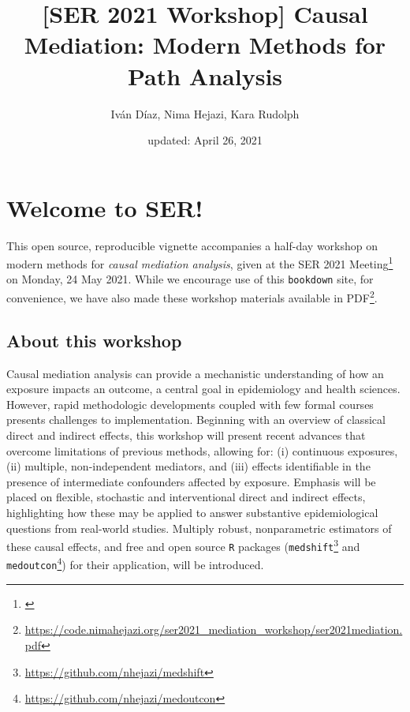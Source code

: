 \documentclass[
  12pt, krantz2,
]{book}
\title{{[}SER 2021 Workshop{]} Causal Mediation: Modern Methods for Path Analysis}
\author{Iván Díaz, Nima Hejazi, Kara Rudolph}
\date{updated: April 26, 2021}
\renewcommand{\href}[2]{#2\footnote{\url{#1}}}
\theoremstyle{definition}
\theoremstyle{definition}
\theoremstyle{definition}
\newcommand{\1}{\mathbbm{1}}
\begin{document}
\maketitle


\thispagestyle{empty}

\begin{center}

\end{center}

\setlength{\abovedisplayskip}{-5pt}
\setlength{\abovedisplayshortskip}{-5pt}

{
\hypersetup{linkcolor=}
\setcounter{tocdepth}{1}
\tableofcontents
}
\listoftables
\listoffigures
\hypertarget{welcome-to-ser}{%
\chapter*{Welcome to SER!}\label{welcome-to-ser}}


This open source, reproducible vignette accompanies a half-day workshop on
modern methods for \emph{causal mediation analysis}, given at the \href{}{SER 2021
Meeting} on Monday, 24 May 2021. While we encourage use of this \texttt{bookdown}
site, for convenience, we have also made these workshop materials \href{https://code.nimahejazi.org/ser2021_mediation_workshop/ser2021mediation.pdf}{available in
PDF}.

\hypertarget{about}{%
\section{About this workshop}\label{about}}

Causal mediation analysis can provide a mechanistic understanding of how an
exposure impacts an outcome, a central goal in epidemiology and health sciences.
However, rapid methodologic developments coupled with few formal courses
presents challenges to implementation. Beginning with an overview of classical
direct and indirect effects, this workshop will present recent advances that
overcome limitations of previous methods, allowing for: (i) continuous
exposures, (ii) multiple, non-independent mediators, and (iii) effects
identifiable in the presence of intermediate confounders affected by exposure.
Emphasis will be placed on flexible, stochastic and interventional direct and
indirect effects, highlighting how these may be applied to answer substantive
epidemiological questions from real-world studies. Multiply robust,
nonparametric estimators of these causal effects, and free and open source \texttt{R}
packages (\href{https://github.com/nhejazi/medshift}{\texttt{medshift}} and
\href{https://github.com/nhejazi/medoutcon}{\texttt{medoutcon}}) for their application, will
be introduced.
\end{document}
